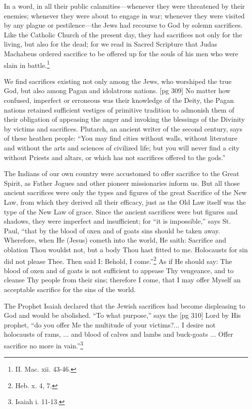 In a word, in all their public calamities—whenever
they were threatened by their enemies; whenever
they were about to engage in war; whenever
they were visited by any plague or pestilence—the
Jews had recourse to God by solemn sacrifices.
Like the Catholic Church of the present day, they
had sacrifices not only for the living, but also for
the dead; for we read in Sacred Scripture that
Judas Machabeus ordered sacrifice to be offered
up for the souls of his men who were slain in
battle.\footnote{II. Mac. xii. 43-46.}

We find sacrifices existing not only among the
Jews, who worshiped the true God, but also
among Pagan and idolatrous nations.
[pg 309]
No matter how confused, imperfect or erroneous
was their knowledge of the Deity, the Pagan nations
retained sufficient vestiges of primitive tradition
to admonish them of their obligation of appeasing
the anger and invoking the blessings of the
Divinity by victims and sacrifices. Plutarch, an
ancient writer of the second century, says of these
heathen people: “You may find cities without
walls, without literature and without the arts and
sciences of civilized life; but you will never find a
city without Priests and altars, or which has not
sacrifices offered to the gods.”

The Indians of our own country were accustomed
to offer sacrifice to the Great Spirit, as
Father Jogues and other pioneer missionaries inform
us. But all those ancient sacrifices were only
the types and figures of the great Sacrifice of the
New Law, from which they derived all their efficacy,
just as the Old Law itself was the type of the
New Law of grace. Since the ancient sacrifices
were but figures and shadows, they were imperfect
and insufficient; for “it is impossible,” says St.
Paul, “that by the blood of oxen and of goats sins
should be taken away. Wherefore, when He
(Jesus) cometh into the world, He saith: Sacrifice
and oblation Thou wouldst not, but a body Thou
hast fitted to me. Holocausts for sin did not please
Thee. Then said I: Behold, I come.”\footnote{Heb.
x. 4, 7.} As if He
should say: The blood of oxen and of goats is not
sufficient to appease Thy vengeance, and to cleanse
Thy people from their sins; therefore I come, that
I may offer Myself an acceptable sacrifice for the
sins of the world.

The Prophet Isaiah declared that the Jewish
sacrifices had become displeasing to God and
would be abolished. “To what purpose,” says the
[pg 310]
Lord by His prophet, “do you offer Me the multitude
of your victims?... I desire not holocausts
of rams, ... and blood of calves and lambs and
buck-goats ... Offer sacrifice no more in vain.”\footnote{Isaiah
i. 11-13.}

